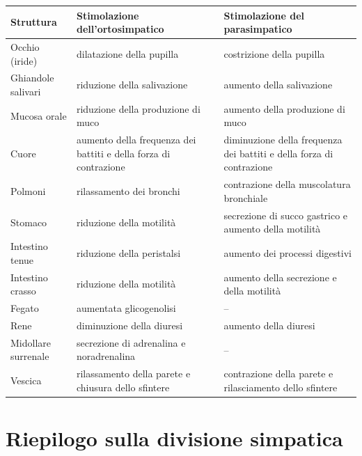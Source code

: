 \begin{table}[htbp]
  \centering
  \small
  \renewcommand{\arraystretch}{1.3}
  \begin{tabularx}{\textwidth}{|l|X|X|}
    \hline
    \textbf{Struttura} & \textbf{Stimolazione dell'ortosimpatico} &
    \textbf{Stimolazione del parasimpatico} \\
    \hline
    Occhio (iride) & dilatazione della pupilla & costrizione della pupilla \\
    \hline
    Ghiandole salivari & riduzione della salivazione & aumento della
    salivazione \\
    \hline
    Mucosa orale & riduzione della produzione di muco & aumento della
    produzione di muco \\
    \hline
    Cuore & aumento della frequenza dei battiti e della forza di
    contrazione & diminuzione della frequenza dei battiti e della forza di
    contrazione \\
    \hline
    Polmoni & rilassamento dei bronchi & contrazione della muscolatura
    bronchiale \\
    \hline
    Stomaco & riduzione della motilità & secrezione di succo gastrico e
    aumento della motilità \\
    \hline
    Intestino tenue & riduzione della peristalsi & aumento dei processi
    digestivi \\
    \hline
    Intestino crasso & riduzione della motilità & aumento della secrezione
    e della motilità \\
    \hline
    Fegato & aumentata glicogenolisi & -- \\
    \hline
    Rene & diminuzione della diuresi & aumento della diuresi \\
    \hline
    Midollare surrenale & secrezione di adrenalina e noradrenalina & -- \\
    \hline
    Vescica & rilassamento della parete e chiusura dello sfintere &
    contrazione della parete e rilasciamento dello sfintere \\
    \hline
  \end{tabularx}
\end{table}

\section{Riepilogo sulla divisione simpatica}

